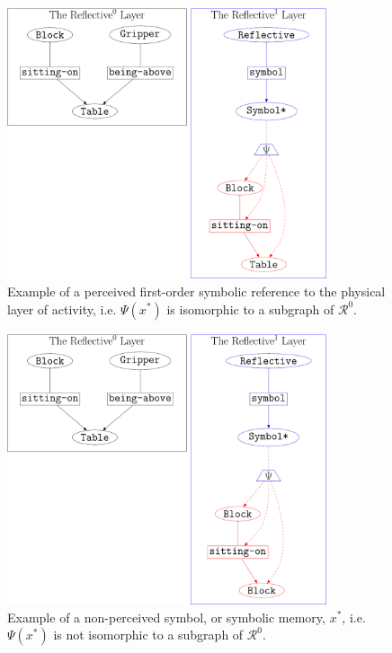 \begin{figure}
\center
\includegraphics[height=8cm]{gfx/example_symbolic_reference_to_physical_activity}
\caption[Example of a perceived first-order symbolic reference to the
  physical layer of activity.]{Example of a perceived first-order
  symbolic reference to the physical layer of activity,
  i.e. $\Psi(x^*)$ is isomorphic to a subgraph of $\mathcal{R}^0$.}
\label{figure:example_symbolic_reference_to_physical_activity}
\end{figure}
\begin{figure}
\center
\includegraphics[height=8cm]{gfx/example_symbolic_memory}
\caption[Example of a non-perceived symbol, or symbolic
  memory.]{Example of a non-perceived symbol, or symbolic memory,
  $x^*$, i.e. $\Psi(x^*)$ is not isomorphic to a subgraph of
  $\mathcal{R}^0$.}
\label{figure:example_symbolic_memory}
\end{figure}


